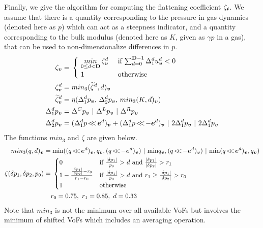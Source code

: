 Finally, we give the algorithm for computing the flattening coefficient 
$\zeta_{\boldsymbol{i}}$. We assume that there is a quantity corresponding to the
pressure in gas dynamics (denoted here as $p$) 
which can act as a steepness indicator, and a
quantity corresponding to the bulk modulus (denoted here as $K$, given
as $\gamma p$ in a gas), that can be used to non-dimensionalize
differences in $p$.
\begin{alignat}{1}
\label{eqn::flattening}
\zeta_\vbold = & \;
  \begin{cases}
  ~ \underset{0 \le d < \Dim}{min} \, \zeta^d_\vbold ~ &
    \text{if $\sum^{\Dim - 1}_{d=0} \Delta^d_1 u^d_\vbold < 0$}
  \\
  ~ 1 &
    \text{otherwise}
\end{cases} \\
\zeta^d_\vbold = & \; min_3(\widetilde{\zeta}^d,d)_\vbold \notag \\
\widetilde{\zeta}^d_\vbold = & \; \eta(\Delta^d_1 p_\vbold, \,
                                   \Delta^d_2 p_\vbold, \,
                              min_3(K,d)_\vbold ) \notag \\
\Delta^d_1 p_\vbold = & \; \Delta^C p_\vbold ~ | ~ \Delta^L p_\vbold ~
| ~ \Delta^R p_\vbold \notag \\ 
\Delta^d_2 p_\vbold = & \; 
(\ebshift{\Delta^d_1 p}{ \ebold^d})_\vbold
 +     (\ebshift{\Delta^d_1 p}{-\ebold^d})_\vbold
                  ~ | ~ 2 \Delta^d_1 p_\vbold
                  ~ | ~ 2 \Delta^d_1 p_\vbold \notag
\end{alignat}
The functions $min_3$ and $\zeta$ are given below.
\begin{gather}
\begin{split}
min_3(q,d)_\vbold = & \; \text{min}((\ebshift{q}{ \ebold^d})_\vbold,
                                       q             _\vbold,
                             (\ebshift{q}{-\ebold^d})_\vbold)
~|~ \text{min}q_\vbold,(\ebshift{q}{-\ebold^d})_\vbold)
~|~ \text{min}(\ebshift{q}{\ebold^d})_\vbold,q_\vbold) \\
\zeta(\delta p_1, \delta p_2, p_0) = & \;
  \begin{cases}
  0 &
    \text{if $\frac{| \delta p_1 |}{p_0} > d$
         and $\frac{| \delta p_1 |}{| \delta p_2 |} > r_1$} \\
  1 - \frac{\frac{| \delta p_1 |}{| \delta p_2 |} - r_0}{r_1 - r_0} &
    \text{if $\frac{| \delta p_1 |}{p_0} > d$
         and $r_1 \ge \frac{| \delta p_1 |}{| \delta p_2 |} > r_0$} \\
  1 &
    \text{otherwise}
  \end{cases}
\\
& r_0 = 0.75, ~ r_1 = 0.85, ~ d = 0.33
\end{split}
\end{gather}
Note that $min_3$ is not the minimum over all available VoFs but
involves the minimum of shifted VoFs which includes an averaging
operation.


